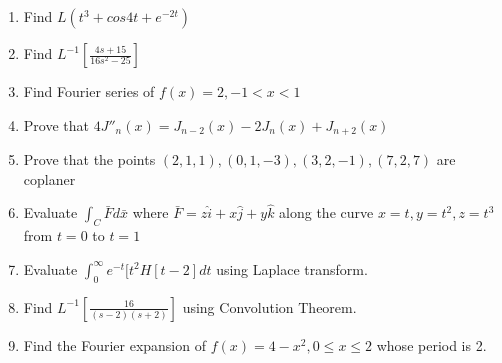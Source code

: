 \documentclass[17pt]{extarticle}
\begin{document}
\begin{enumerate}
    \item Find $ L(t^3 + cos 4t + e^{-2t} ) $
    \item Find $ L^{-1} \left[ \frac{4s+15}{16s^2-25} \right] $
    \item Find Fourier series of $ f(x) = 2, -1<x<1 $
    \item Prove that $ 4J''_n(x) =  J_{n-2}(x) - 2J_n(x) + J_{n+2}(x)  $
    \item Prove that the points $(2,1,1), (0,1,-3), (3,2,-1), (7,2,7)  $
    are coplaner
    \item Evaluate $\int_C \bar{F}d\bar{x}$ where $\bar{F}=z\hat{i}+x\hat{j}+y\hat{k}$ along the curve $x=t, y=t^2, z=t^3$ from $t=0$ to $t=1$
    \item Evaluate $ \int_0^{\infty} e^{-t}[t^2H[t-2]dt$ using Laplace transform.
    \item Find $ L^{-1} \left[ \frac{16}{(s-2)(s+2)} \right] $ using Convolution Theorem.
    \item Find the Fourier expansion of $ f(x) = 4-x^2, 0 \leq x \leq 2 $ whose period is 2.
    
\end{enumerate}
\end{document}
